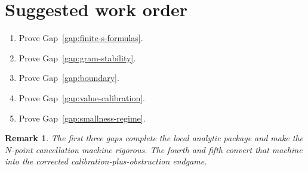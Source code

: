 \documentclass[11pt]{article}
\newtheorem{remark}[theorem]{Remark}
\begin{document}
\section{Suggested work order}

\begin{enumerate}[label=\arabic*.]
\item Prove Gap~\ref{gap:finite-s-formulas}.
\item Prove Gap~\ref{gap:gram-stability}.
\item Prove Gap~\ref{gap:boundary}.
\item Prove Gap~\ref{gap:value-calibration}.
\item Prove Gap~\ref{gap:smallness-regime}.
\end{enumerate}

\begin{remark}
The first three gaps complete the local analytic package and make the
$N$-point cancellation machine rigorous. The fourth and fifth convert that
machine into the corrected calibration-plus-obstruction endgame.
\end{remark}
\end{document}
